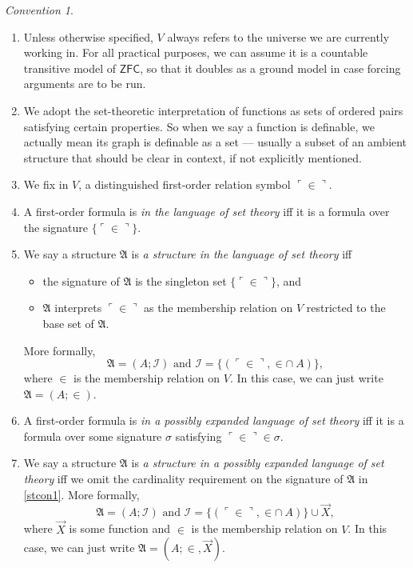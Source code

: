 \documentclass[12pt, twoside]{memoir}
\numberwithin{equation}{section}
\theoremstyle{definition}
\theoremstyle{remark}
\newtheorem{con}[thm]{Convention}
\theoremstyle{definition}
\theoremstyle{definition}
\theoremstyle{definition}
\theoremstyle{remark}
\begin{document}
\begin{con}
\leavevmode
\begin{enumerate}[label=(\arabic*)]
    \item Unless otherwise specified, $V$ always refers to the universe we are currently working in. For all practical purposes, we can assume it is a countable transitive model of $\mathsf{ZFC}$, so that it doubles as a ground model in case forcing arguments are to be run.
    \item We adopt the set-theoretic interpretation of functions as sets of ordered pairs satisfying certain properties. So when we say a function is definable, we actually mean its graph is definable as a set --- usually a subset of an ambient structure that should be clear in context, if not explicitly mentioned.
    \item We fix in $V$, a distinguished first-order relation symbol $\ulcorner \in \urcorner$.
    \item A first-order formula is \emph{in the language of set theory} iff it is a formula over the signature $\{\ulcorner \in \urcorner\}$.
    \item\label{stcon1} We say a structure $\mathfrak{A}$ is \emph{a structure in the language of set theory} iff 
    \begin{itemize}
        \item the signature of $\mathfrak{A}$ is the singleton set $\{\ulcorner \in \urcorner\}$, and
        \item $\mathfrak{A}$ interprets $\ulcorner \in \urcorner$ as the membership relation on $V$ restricted to the base set of $\mathfrak{A}$.
    \end{itemize}
    More formally, $$\mathfrak{A} = (A; \mathcal{I}) \text{ and } \mathcal{I} = \{(\ulcorner \in \urcorner, \in \cap \ A)\},$$ where $\in$ is the membership relation on $V$. In this case, we can just write $\mathfrak{A} = (A; \in)$.
    \item A first-order formula is \emph{in a possibly expanded language of set theory} iff it is a formula over some signature $\sigma$ satisfying $\ulcorner \in \urcorner \in \sigma$.
    \item We say a structure $\mathfrak{A}$ is \emph{a structure in a possibly expanded language of set theory} iff we omit the cardinality requirement on the signature of $\mathfrak{A}$ in \ref{stcon1}. More formally, $$\mathfrak{A} = (A; \mathcal{I}) \text{ and } \mathcal{I} = \{(\ulcorner \in \urcorner, \in \cap \ A)\} \cup \Vec{X},$$ where $\Vec{X}$ is some function and $\in$ is the membership relation on $V$. In this case, we can just write $\mathfrak{A} = (A; \in, \Vec{X})$.

\end{enumerate}
\end{con}
\end{document}
